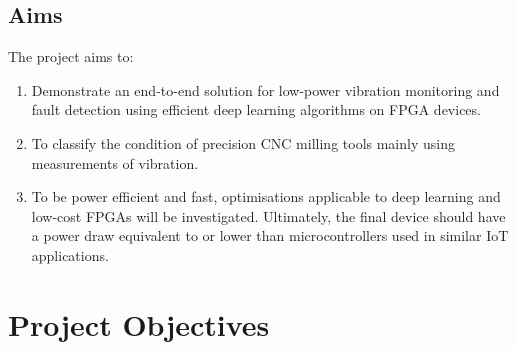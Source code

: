 \documentclass{article}
\begin{document}
\subsection{Aims}

The project aims to: 

\begin{enumerate}
    \item Demonstrate an end-to-end solution for low-power vibration monitoring and fault detection using efficient deep learning algorithms on FPGA devices.
    \item To classify the condition of precision CNC milling tools mainly using measurements of vibration.
    \item To be power efficient and fast, optimisations applicable to deep learning and low-cost FPGAs will be investigated. Ultimately, the final device should have a power draw equivalent to or lower than microcontrollers used in similar IoT applications.
\end{enumerate}

\section{Project Objectives}\label{objectives}

\end{document}
